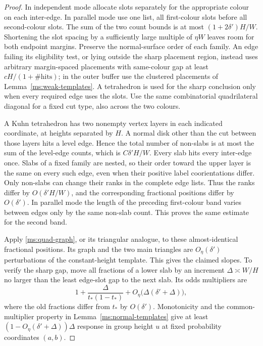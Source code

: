 \begin{proof}
In independent mode allocate slots separately for the appropriate
colour on each inter-edge.  In parallel mode use one list, all
first-colour slots before all second-colour slots.  The sum of the
two count bounds is at most $(1+2\delta')H/W$.  Shortening the slot
spacing by a sufficiently large multiple of $\eta W$ leaves room
for both endpoint margins.  Preserve the normal-surface order of
each family.  An edge failing its eligibility test, or lying outside
the sharp placement region, instead uses arbitrary margin-spaced
placements with same-colour gap at least
$cH/(1+\#\text{hits})$; in the outer buffer use the clustered
placements of Lemma~\ref{ms:weak-templates}.  A tetrahedron is used for
the sharp conclusion only when every required edge uses the slots.
Use the same combinatorial quadrilateral diagonal for a fixed cut
type, also across the two colours.

A Kuhn tetrahedron has two nonempty vertex layers in each indicated
coordinate, at heights separated by $H$.  A normal disk other than
the cut between those layers hits a level edge.  Hence the total
number of non-slabs is at most the sum of the level-edge counts,
which is $C\delta'H/W$.  Every slab hits every inter-edge once.
Slabs of a fixed family are nested, so their order toward the upper
layer is the same on every such edge, even when their positive
label coorientations differ.  Only non-slabs can change their ranks
in the complete edge lists.  Thus the ranks differ by
$O(\delta'H/W)$, and the corresponding fractional positions differ
by $O(\delta')$.  In parallel mode the length of the preceding
first-colour band varies between edges only by the same non-slab
count.  This proves the same estimate for the second band.

Apply \eqref{ms:quad-graph}, or its triangular analogue, to these
almost-identical fractional positions.  Its graph and the two main
triangles are $O_\eta(\delta')$ perturbations of the constant-height
template.  This gives the claimed slopes.  To verify the sharp gap,
move all fractions of a lower slab by an increment
$\Delta\asymp W/H$ no larger than the least edge-slot gap to the
next slab.  Its odds multipliers are
\[
 1+\frac{\Delta}{t_*(1-t_*)}
       +O_\eta\bigl(\Delta(\delta'+\Delta)\bigr),
\]
where the old fractions differ from $t_*$ by $O(\delta')$.
Monotonicity and the common-multiplier property in
Lemma~\ref{ms:normal-templates} give at least
$(1-O_\eta(\delta'+\Delta))\Delta$ response in group height $u$ at
fixed probability coordinates $(a,b)$.


\end{proof}
